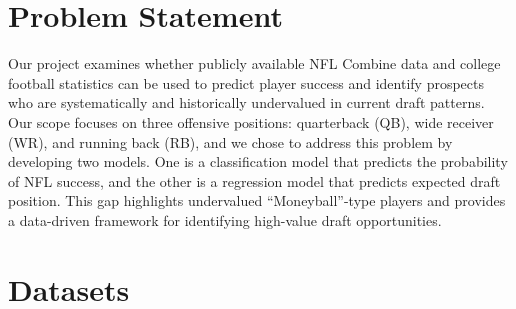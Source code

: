 \documentclass[11pt]{article}
\begin{document}
\section{Problem Statement}


Our project examines whether publicly available NFL Combine data and college football statistics can be used to predict player success and identify prospects who are systematically and historically undervalued in current draft patterns. Our scope focuses on three offensive positions: quarterback (QB), wide receiver (WR), and running back (RB), and we chose to address this problem by developing two models. One is a classification model that predicts the probability of NFL success, and the other is a regression model that predicts expected draft position. This gap highlights undervalued “Moneyball”-type players and provides a data-driven framework for identifying high-value draft opportunities.



\section{Datasets}

\end{document}
